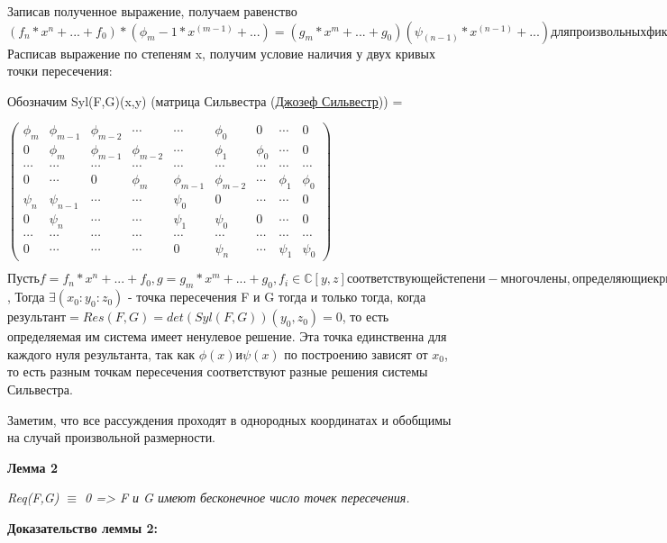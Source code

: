 \documentclass[a4paper, 12pt]{article}
\begin{document}
Записав полученное выражение, получаем равенство $(f_n*x^n + ... + f_0)*(\phi_m-1*x^(m-1) + ...) = (g_m*x^m + ... + g_0)(\psi_(n-1)*x^(n-1) + ...) для произвольных фиксированных y_0, z_0$
Расписав выражение по степеням x, получим условие наличия у двух кривых точки пересечения:

Обозначим Syl(F,G)(x,y) (матрица Сильвестра (\href{https://ru.wikipedia.org/wiki/%D0%A1%D0%B8%D0%BB%D1%8C%D0%B2%D0%B5%D1%81%D1%82%D1%80,_%D0%94%D0%B6%D0%B5%D0%B9%D0%BC%D1%81_%D0%94%D0%B6%D0%BE%D0%B7%D0%B5%D1%84}{Джозеф Сильвестр})) =

$\begin{pmatrix}
\phi_m & \phi_{m-1} & \phi_{m-2} & \cdots & \cdots & \phi_0 & 0 & \cdots & 0 \\
0 & \phi_m & \phi_{m-1} & \phi_{m-2} & \cdots & \phi_1 & \phi_0 & \cdots & 0 \\
\cdots & \cdots & \cdots & \cdots & \cdots & \cdots & \cdots & \cdots & \cdots \\
0 & \cdots & 0 & \phi_m & \phi_{m-1} & \phi_{m-2} & \cdots & \phi_1 & \phi_0 \\
\psi_n & \psi_{n-1} & \cdots & \cdots & \psi_0 & 0 & \cdots & \cdots & 0 \\
0 & \psi_n & \cdots & \cdots & \psi_1 & \psi_0 & 0 & \cdots & 0 \\
\cdots & \cdots & \cdots & \cdots & \cdots & \cdots & \cdots & \cdots & \cdots \\
0 & \cdots & \cdots & \cdots & 0 & \psi_n & \cdots & \psi_1 & \psi_0
\end{pmatrix}$

$Пусть f=f_n*x^n + ... + f_0, g=g_m*x^m + ... + g_0, f_i \in \mathbb{C}[y,z] соответствующей степени - многочлены, определяющие кривые F и G$,
Тогда $\exists (x_0:y_0:z_0)$ - точка пересечения F и G тогда и только тогда, когда $результант = Res(F,G) = det(Syl(F,G))(y_0,z_0) = 0$, то есть определяемая им система имеет ненулевое решение. Эта точка единственна для каждого нуля результанта, так как $\phi(x) и \psi(x)$ по построению зависят от $x_0$, то есть разным точкам пересечения соответствуют разные решения системы Сильвестра.

Заметим, что все рассуждения проходят в однородных координатах и обобщимы на случай произвольной размерности.

\textbf{Лемма 2}

\textit{Req(F,G) $\equiv$ 0 => F и G имеют бесконечное число точек пересечения.}

\textbf{Доказательство леммы 2:}
\end{document}
